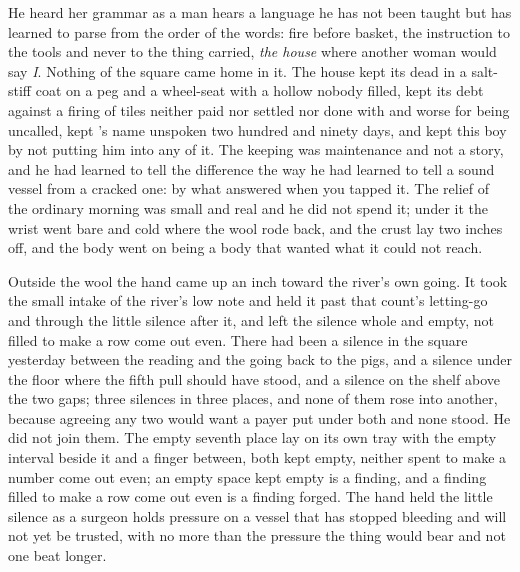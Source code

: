 He heard her grammar as a man hears a language he has not been taught but has learned to parse from the order of the words: fire before basket, the instruction to the tools and never to the thing carried, \emph{the house} where another woman would say \emph{I}. Nothing of the square came home in it. The house kept its dead in a salt-stiff coat on a peg and a wheel-seat with a hollow nobody filled, kept its debt against a firing of tiles neither paid nor settled nor done with and worse for being uncalled, kept 's name unspoken two hundred and ninety days, and kept this boy by not putting him into any of it. The keeping was maintenance and not a story, and he had learned to tell the difference the way he had learned to tell a sound vessel from a cracked one: by what answered when you tapped it. The relief of the ordinary morning was small and real and he did not spend it; under it the wrist went bare and cold where the wool rode back, and the crust lay two inches off, and the body went on being a body that wanted what it could not reach.

\scenebreak

Outside the wool the hand came up an inch toward the river's own going. It took the small intake of the river's low note and held it past that count's letting-go and through the little silence after it, and left the silence whole and empty, not filled to make a row come out even. There had been a silence in the square yesterday between the reading and the going back to the pigs, and a silence under the floor where the fifth pull should have stood, and a silence on the shelf above the two gaps; three silences in three places, and none of them rose into another, because agreeing any two would want a payer put under both and none stood. He did not join them. The empty seventh place lay on its own tray with the empty interval beside it and a finger between, both kept empty, neither spent to make a number come out even; an empty space kept empty is a finding, and a finding filled to make a row come out even is a finding forged. The hand held the little silence as a surgeon holds pressure on a vessel that has stopped bleeding and will not yet be trusted, with no more than the pressure the thing would bear and not one beat longer.

